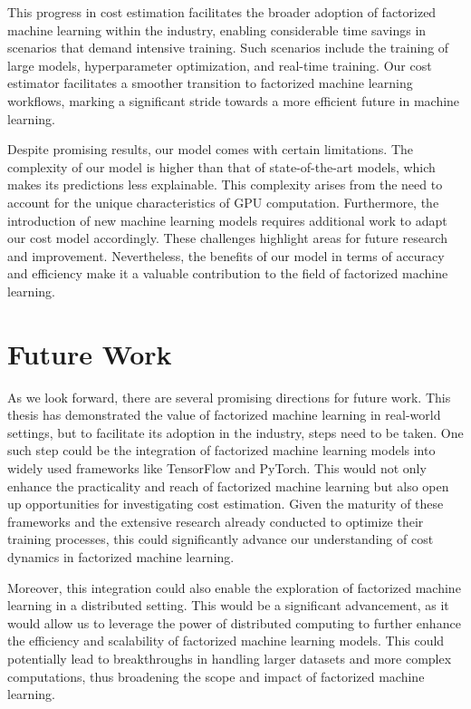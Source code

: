This progress in cost estimation facilitates the broader adoption of factorized machine learning within the industry, enabling considerable time savings in scenarios that demand intensive training. Such scenarios include the training of large models, hyperparameter optimization, and real-time training. Our cost estimator facilitates a smoother transition to factorized machine learning workflows, marking a significant stride towards a more efficient future in machine learning.

Despite promising results, our model comes with certain limitations. The complexity of our model is higher than that of state-of-the-art models, which makes its predictions less explainable. This complexity arises from the need to account for the unique characteristics of GPU computation. Furthermore, the introduction of new machine learning models requires additional work to adapt our cost model accordingly. These challenges highlight areas for future research and improvement. Nevertheless, the benefits of our model in terms of accuracy and efficiency make it a valuable contribution to the field of factorized machine learning.
\section{Future Work}
\label{sec:7-future-work}
As we look forward, there are several promising directions for future work. This thesis has demonstrated the value of factorized machine learning in real-world settings, but to facilitate its adoption in the industry, steps need to be taken. One such step could be the integration of factorized machine learning models into widely used frameworks like TensorFlow and PyTorch. This would not only enhance the practicality and reach of factorized machine learning but also open up opportunities for investigating cost estimation. Given the maturity of these frameworks and the extensive research already conducted to optimize their training processes, this could significantly advance our understanding of cost dynamics in factorized machine learning.

Moreover, this integration could also enable the exploration of factorized machine learning in a distributed setting. This would be a significant advancement, as it would allow us to leverage the power of distributed computing to further enhance the efficiency and scalability of factorized machine learning models. This could potentially lead to breakthroughs in handling larger datasets and more complex computations, thus broadening the scope and impact of factorized machine learning.

